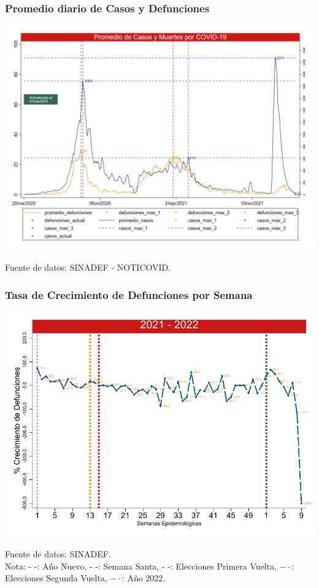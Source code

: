 \documentclass[xcolor=table]{beamer}
\begin{document}
		\begin{frame}
		\frametitle{Promedio diario de Casos y Defunciones}
		\vspace{-.5cm}
		\begin{center}
			\includegraphics[width=0.9\linewidth, trim={0cm .5cm 0cm 0.2cm},clip]{../figuras/promedio_casos_defuncion_2020_2021_2022.png}
		\end{center}
		{\tiny Fuente de datos: SINADEF - NOTICOVID.}\\
	\end{frame}
	
	\begin{frame}
		\frametitle{Tasa de Crecimiento de Defunciones por Semana}
		\vspace{-.5cm}
		\begin{center}
			\includegraphics[width=0.9\linewidth]{../figuras/defunciones_crecimiento_21_22.pdf}
		\end{center} 
		{\tiny Fuente de datos: SINADEF. \\
			Nota: {\color{mycolor1} - -: Año Nuevo}, {\color{mycolor2} - -: Semana Santa}, {\color{mycolor3} - -: Elecciones Primera Vuelta}, {\color{mycolor4} $- \cdot$: Elecciones Segunda Vuelta}, {\color{mycolor7} $- \cdot$: Año 2022}. \\}
	\end{frame}
\end{document}

